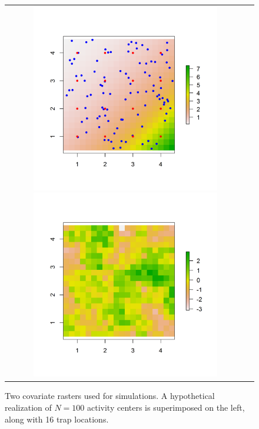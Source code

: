 \documentclass[12pt]{article}
\begin{document}
\begin{figure}
\begin{tabular}{cc}
\includegraphics[height=3.25in,width=3.25in]{figs/raster_withN100}
\includegraphics[height=3.25in,width=3.25in]{figs/raster_krige} &
\end{tabular}
\caption{Two covariate rasters used for simulations. A hypothetical
  realization of $N=100$ activity centers is superimposed on the left,
along with 16 trap locations. }
\label{ecoldist.fig.raster100}
\end{figure}
\end{document}
